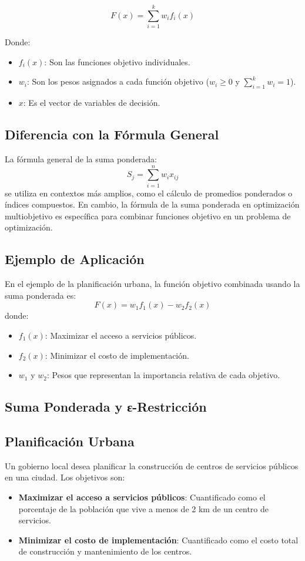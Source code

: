 \documentclass[12pt]{article}
\begin{document}
\[
F(x) = \sum_{i=1}^k w_i f_i(x)
\]

Donde:
\begin{itemize}
    \item \( f_i(x) \): Son las funciones objetivo individuales.
    \item \( w_i \): Son los pesos asignados a cada función objetivo (\( w_i \geq 0 \) y \( \sum_{i=1}^k w_i = 1 \)).
    \item \( x \): Es el vector de variables de decisión.
\end{itemize}

\subsection*{Diferencia con la Fórmula General}
La fórmula general de la suma ponderada:
\[
S_j = \sum_{i=1}^n w_i x_{ij}
\]
se utiliza en contextos más amplios, como el cálculo de promedios ponderados o índices compuestos. En cambio, la fórmula de la suma ponderada en optimización multiobjetivo es específica para combinar funciones objetivo en un problema de optimización.

\subsection*{Ejemplo de Aplicación}
En el ejemplo de la planificación urbana, la función objetivo combinada usando la suma ponderada es:
\[
F(x) = w_1 f_1(x) - w_2 f_2(x)
\]
donde:
\begin{itemize}
    \item \( f_1(x) \): Maximizar el acceso a servicios públicos.
    \item \( f_2(x) \): Minimizar el costo de implementación.
    \item \( w_1 \) y \( w_2 \): Pesos que representan la importancia relativa de cada objetivo.
\end{itemize}

\subsection*{Suma Ponderada y ε-Restricción}
\subsection*{Planificación Urbana}
Un gobierno local desea planificar la construcción de centros de servicios públicos en una ciudad. Los objetivos son:
\begin{itemize}
    \item \textbf{Maximizar el acceso a servicios públicos}: Cuantificado como el porcentaje de la población que vive a menos de 2 km de un centro de servicios.
    \item \textbf{Minimizar el costo de implementación}: Cuantificado como el costo total de construcción y mantenimiento de los centros.
\end{itemize}
\end{document}
